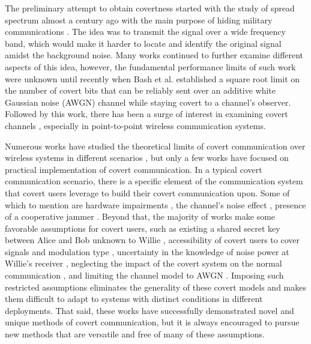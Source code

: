 The preliminary attempt to obtain covertness started with the study of spread spectrum almost a century ago with the main purpose of hiding military communications \cite{scholtz1982origins}. The idea was to transmit the signal over a wide frequency band, which would make it harder to locate and identify the original signal amidst the background noise. Many works continued to further examine different aspects of this idea, however, the fundamental performance limits of such work were unknown until recently when Bash et al. \cite{bash2012square} established a square root limit on the number of covert bits that can be reliably sent over an additive white Gaussian noise (AWGN) channel while staying covert to a channel's observer. Followed by this work, there has been a surge of interest in examining covert channels \cite{sobers2017covert,soltani2018covert}, especially in point-to-point wireless communication systems.


Numerous works have studied the theoretical limits of covert communication over wireless systems in different scenarios \cite{bash2012square, soltani2018covert, sheikholeslami2018multi, li2021fundamental}, but only a few works have focused on practical implementation of covert communication. In a typical covert communication scenario, there is a specific element of the communication system that covert users leverage to build their covert communication upon. Some of which to mention are hardware impairments \cite{mohammed2021adversarial}, the channel's noise effect \cite{soltani2018covert}, presence of a cooperative jammer \cite{sobers2017covert}. Beyond that, the majority of works make some favorable assumptions for covert users, such as existing a shared secret key between Alice and Bob unknown to Willie \cite{soltani2018covert}, accessibility of covert users to cover signals and modulation type \cite{grzesiak2021wireless}, uncertainty in the knowledge of noise power at Willie's receiver \cite{he2017covert}, neglecting the impact of the covert system on the normal communication \cite{mohammed2021adversarial}, and limiting the channel model to AWGN \cite{mohammed2021adversarial}. Imposing such restricted assumptions eliminates the generality of these covert models and makes them difficult to adapt to systems with distinct conditions in different deployments. That said, these works have successfully demonstrated novel and unique methods of covert communication, but it is always encouraged to pursue new methods that are versatile and free of many of these assumptions.


